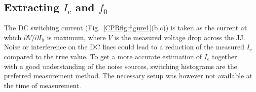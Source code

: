 \subsection{Extracting $I_\text{c}$ and $f_0$}\label{sec:SMextraction}

The DC switching current (Fig.~\ref{CPRfig:figure1}(b,c)) is taken as the current at which $\partial V/\partial I_\text{b}$ is maximum, where $V$ is the measured voltage drop across the JJ.
%
Noise or interference on the DC lines could lead to a reduction of the measured $I_\text{c}$ compared to the true value.
%
To get a more accurate estimation of $I_\text{c}$ together with a good understanding of the noise sources, switching histograms are the preferred measurement method.
%
The necessary setup was however not available at the time of measurement.

